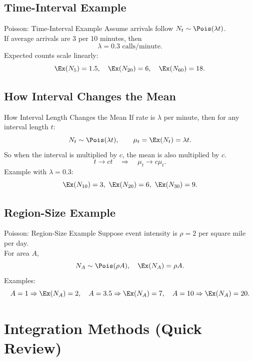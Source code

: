 \documentclass[aspectratio=169]{beamer}
\begin{document}
\subsection{Time-Interval Example}
\begin{frame}{Poisson: Time-Interval Example}
  Assume arrivals follow \(N_t \sim \Pois(\lambda t)\).\\[4pt]
  If average arrivals are 3 per 10 minutes, then
  \[
    \lambda = 0.3 \text{ calls/minute}.
  \]
  Expected counts scale linearly:
  \[
    \Ex(N_5)=1.5,\quad \Ex(N_{20})=6,\quad \Ex(N_{60})=18.
  \]
\end{frame}

\subsection{How Interval Changes the Mean}
\begin{frame}{How Interval Length Changes the Mean}
  If rate is \(\lambda\) per minute, then for any interval length \(t\):
  \[
    N_t\sim\Pois(\lambda t),\qquad \mu_t=\Ex(N_t)=\lambda t.
  \]
  So when the interval is multiplied by \(c\), the mean is also multiplied by \(c\).
  \[
    t \to ct \quad\Longrightarrow\quad \mu_t \to c\mu_t.
  \]
  Example with \(\lambda=0.3\):
  \[
    \Ex(N_{10})=3,\ \Ex(N_{20})=6,\ \Ex(N_{30})=9.
  \]
\end{frame}

\subsection{Region-Size Example}
\begin{frame}{Poisson: Region-Size Example}
  Suppose event intensity is \(\rho=2\) per square mile per day.\\[4pt]
  For area \(A\),
  \[
    N_A \sim \Pois(\rho A), \quad \Ex(N_A)=\rho A.
  \]
  Examples:
  \[
    A=1 \Rightarrow \Ex(N_A)=2,\quad
    A=3.5 \Rightarrow \Ex(N_A)=7,\quad
    A=10 \Rightarrow \Ex(N_A)=20.
  \]
\end{frame}

\section{Integration Methods (Quick Review)}
\end{document}
